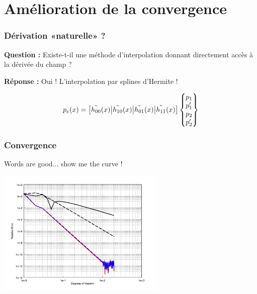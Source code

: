 \documentclass[10pt, compress]{beamer}
\begin{document}
\section{Amélioration de la convergence}

\begin{frame}
	\frametitle{Dérivation «naturelle» ?}

	\textbf{Question :} Existe-t-il une méthode d'interpolation donnant \alert{directement accès} à la dérivée du champ
	?

	\pause
	\bigskip

	\textbf{Réponse :} Oui ! L'interpolation par \alert{splines d'Hermite} !

	\begin{equation*}
		p_e(x) = \left[\tilde{h_{00}}(x)\big|\tilde{h_{10}}(x)\big|\tilde{h_{01}}(x)\big|\tilde{h_{11}}(x)\right]\begin{Bmatrix}p_1\\p'_1\\p_2\\p'_2\end{Bmatrix}
	\end{equation*}
\end{frame}

\begin{frame}
	\frametitle{Convergence}

	\begin{block}{Words are good... show me the curve !}
		\begin{center}
			\includegraphics[width=0.6\textwidth]{../report/part4/figs/herm_comp.png}
		\end{center}
	\end{block}
\end{frame}
\end{document}
